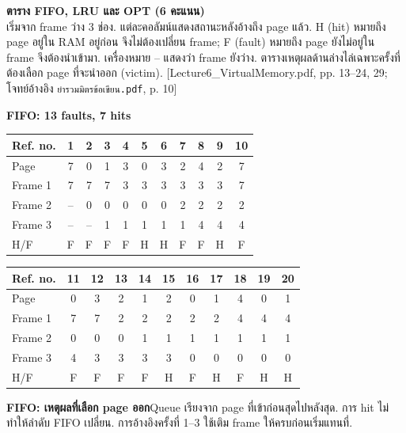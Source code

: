 \newpage{}
\noindent\textbf{ตาราง FIFO, LRU และ OPT (6 คะแนน)}\\
เริ่มจาก frame ว่าง 3 ช่อง. แต่ละคอลัมน์แสดงสถานะหลังอ้างถึง page แล้ว. H (hit) หมายถึง page อยู่ใน RAM อยู่ก่อน จึงไม่ต้องเปลี่ยน frame; F (fault) หมายถึง page ยังไม่อยู่ใน frame จึงต้องนำเข้ามา. เครื่องหมาย -- แสดงว่า frame ยังว่าง. ตารางเหตุผลด้านล่างไล่เฉพาะครั้งที่ต้องเลือก page ที่จะนำออก (victim). {\small [Lecture6\_VirtualMemory.pdf, pp. 13--24, 29; โจทย์อ้างอิง \texttt{ยำรวมมิตรข้อเขียน.pdf}, p. 10]}\par\medskip

\noindent\textbf{FIFO: 13 faults, 7 hits}
{\setlength{\tabcolsep}{5pt}\begin{center}\renewcommand{\arraystretch}{1.15}\begin{tabular}{l|cccccccccc}
Ref. no. & 1 & 2 & 3 & 4 & 5 & 6 & 7 & 8 & 9 & 10\\\hline
Page & 7 & 0 & 1 & 3 & 0 & 3 & 2 & 4 & 2 & 7\\
Frame 1 & 7 & 7 & 7 & 3 & 3 & 3 & 3 & 3 & 3 & 7\\
Frame 2 & -- & 0 & 0 & 0 & 0 & 0 & 2 & 2 & 2 & 2\\
Frame 3 & -- & -- & 1 & 1 & 1 & 1 & 1 & 4 & 4 & 4\\
H/F & F & F & F & F & H & H & F & F & H & F\\
\end{tabular}\end{center}}
{\setlength{\tabcolsep}{5pt}\begin{center}\renewcommand{\arraystretch}{1.15}\begin{tabular}{l|cccccccccc}
Ref. no. & 11 & 12 & 13 & 14 & 15 & 16 & 17 & 18 & 19 & 20\\\hline
Page & 0 & 3 & 2 & 1 & 2 & 0 & 1 & 4 & 0 & 1\\
Frame 1 & 7 & 7 & 2 & 2 & 2 & 2 & 2 & 4 & 4 & 4\\
Frame 2 & 0 & 0 & 0 & 1 & 1 & 1 & 1 & 1 & 1 & 1\\
Frame 3 & 4 & 3 & 3 & 3 & 3 & 0 & 0 & 0 & 0 & 0\\
H/F & F & F & F & F & H & F & H & F & H & H\\
\end{tabular}\end{center}}
\noindent\textbf{FIFO: เหตุผลที่เลือก page ออก}\quad Queue เรียงจาก page ที่เข้าก่อนสุดไปหลังสุด. การ hit ไม่ทำให้ลำดับ FIFO เปลี่ยน. การอ้างอิงครั้งที่ 1--3 ใช้เติม frame ให้ครบก่อนเริ่มแทนที่.\par\smallskip
